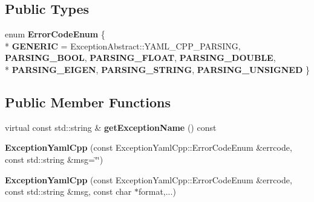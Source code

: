 \subsection*{Public Types}
\begin{DoxyCompactItemize}
\item 
enum {\bfseries Error\+Code\+Enum} \{ \\*
{\bfseries G\+E\+N\+E\+R\+IC} = Exception\+Abstract\+:\+:Y\+A\+M\+L\+\_\+\+C\+P\+P\+\_\+\+P\+A\+R\+S\+I\+NG, 
{\bfseries P\+A\+R\+S\+I\+N\+G\+\_\+\+B\+O\+OL}, 
{\bfseries P\+A\+R\+S\+I\+N\+G\+\_\+\+F\+L\+O\+AT}, 
{\bfseries P\+A\+R\+S\+I\+N\+G\+\_\+\+D\+O\+U\+B\+LE}, 
\\*
{\bfseries P\+A\+R\+S\+I\+N\+G\+\_\+\+E\+I\+G\+EN}, 
{\bfseries P\+A\+R\+S\+I\+N\+G\+\_\+\+S\+T\+R\+I\+NG}, 
{\bfseries P\+A\+R\+S\+I\+N\+G\+\_\+\+U\+N\+S\+I\+G\+N\+ED}
 \}\hypertarget{classdynamic__graph_1_1ExceptionYamlCpp_aaf84f3285b4c635c35cd39aba7ac9a5a}{}\label{classdynamic__graph_1_1ExceptionYamlCpp_aaf84f3285b4c635c35cd39aba7ac9a5a}

\end{DoxyCompactItemize}
\subsection*{Public Member Functions}
\begin{DoxyCompactItemize}
\item 
virtual const std\+::string \& {\bfseries get\+Exception\+Name} () const \hypertarget{classdynamic__graph_1_1ExceptionYamlCpp_a2798dc770d78aba251dfa2fa33d05269}{}\label{classdynamic__graph_1_1ExceptionYamlCpp_a2798dc770d78aba251dfa2fa33d05269}

\item 
{\bfseries Exception\+Yaml\+Cpp} (const Exception\+Yaml\+Cpp\+::\+Error\+Code\+Enum \&errcode, const std\+::string \&msg=\char`\"{}\char`\"{})\hypertarget{classdynamic__graph_1_1ExceptionYamlCpp_ae6dc871402ab15a7af2181d3b2e5bc5e}{}\label{classdynamic__graph_1_1ExceptionYamlCpp_ae6dc871402ab15a7af2181d3b2e5bc5e}

\item 
{\bfseries Exception\+Yaml\+Cpp} (const Exception\+Yaml\+Cpp\+::\+Error\+Code\+Enum \&errcode, const std\+::string \&msg, const char $\ast$format,...)\hypertarget{classdynamic__graph_1_1ExceptionYamlCpp_a823359f3d24ad6930042d4d5c2443988}{}\label{classdynamic__graph_1_1ExceptionYamlCpp_a823359f3d24ad6930042d4d5c2443988}

\end{DoxyCompactItemize}
